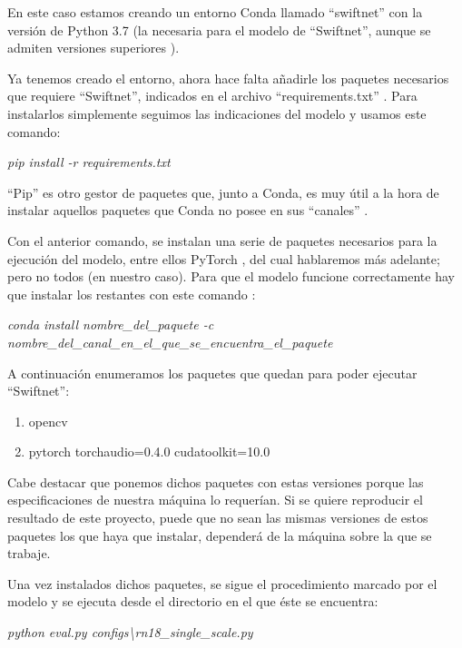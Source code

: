 En este caso estamos creando un entorno Conda llamado ``swiftnet'' con la versión de Python 3.7 (la necesaria para el modelo de ``Swiftnet'', aunque se admiten versiones superiores  \cite{github_swiftnet}).


Ya tenemos creado el entorno, ahora hace falta añadirle los paquetes necesarios que requiere ``Swiftnet'', indicados en el archivo ``requirements.txt'' \cite{github_swiftnet}. Para instalarlos simplemente seguimos las indicaciones del modelo y usamos este comando:

\begin{center}
\textit{pip install -r requirements.txt}
\end{center}

``Pip'' es otro gestor de paquetes que, junto a Conda, es muy útil a la hora de instalar aquellos paquetes que Conda no posee en sus ``canales'' \cite{pip}.

Con el anterior comando, se instalan una serie de paquetes necesarios para la ejecución del modelo, entre ellos PyTorch \cite{pytorch}, del cual hablaremos más adelante; pero no todos (en nuestro caso). Para que el modelo funcione correctamente hay que instalar los restantes con este comando \cite{conda_sheet}:

\begin{center}
\textit{conda install nombre\_del\_paquete -c nombre\_del\_canal\_en\_el\_que\_se\_encuentra\_el\_paquete}
\end{center}

A continuación enumeramos los paquetes que quedan para poder ejecutar ``Swiftnet'':

\begin{enumerate}
\item opencv \cite{opencv}
\item pytorch torchaudio=0.4.0 cudatoolkit=10.0 \cite{pytorch}
\end{enumerate}

Cabe destacar que ponemos dichos paquetes con estas versiones porque las especificaciones de nuestra máquina lo requerían. Si se quiere reproducir el resultado de este proyecto, puede que no sean las mismas versiones de estos paquetes los que haya que instalar, dependerá de la máquina sobre la que se trabaje.

Una vez instalados dichos paquetes, se sigue el procedimiento marcado por el modelo y se ejecuta desde el directorio en el que éste se encuentra:

\begin{center}
\textit{python eval.py configs\textbackslash{rn18\_single\_scale.py}}
\end{center}

